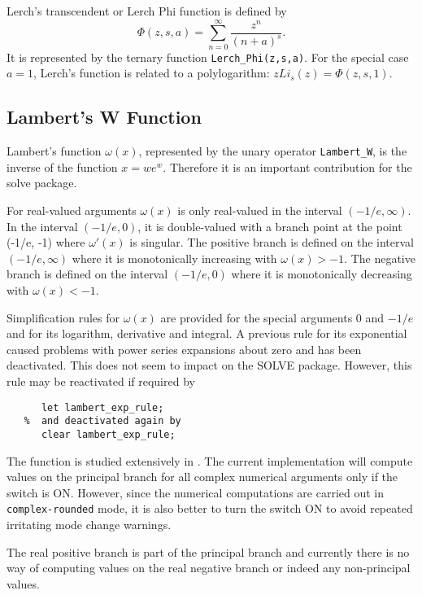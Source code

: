 Lerch's transcendent or Lerch Phi function is defined by
$$\Phi(z,s,a) = \sum_{n=0}^\infty \frac{z^n}{(n+a)^s}.$$
It is represented by the ternary function \texttt{Lerch\_Phi(z,s,a)}.
For the special case $a=1$, Lerch's function is related to a polylogarithm:
$z Li_s(z) = \Phi(z,s,1)$.

\subsection{Lambert's W Function}
\hypertarget{LAMBERTW}{}

Lambert's function $\omega(x)$, represented by the unary
operator \texttt{Lambert\_W}, is the inverse of the function
$x=we^w$. Therefore it is an important contribution for the solve
package.

For real-valued arguments $\omega(x)$ is only real-valued in the
interval $(-1/e, \infty)$.  In the interval $(-1/e, 0)$, it is double-valued
with a branch point at the point (-1/e, -1) where $\omega'(x)$ is singular.
The positive branch is defined on the interval $(-1/e, \infty)$ where it is
monotonically increasing with $\omega(x) > -1$. The negative branch is defined
on the interval $(-1/e, 0)$ where it is monotonically decreasing with
$\omega(x) < -1$.

Simplification rules for $\omega(x)$ are provided for the special arguments
$0$ and $-1/e$ and for its logarithm, derivative and integral.
A previous rule for its exponential caused problems with power series expansions
about zero and has been deactivated. This does not seem to impact on the SOLVE
package. However, this rule may be reactivated if required by
\begin{verbatim}
      let lambert_exp_rule;
   %  and deactivated again by
      clear lambert_exp_rule;
\end{verbatim}

The function is studied extensively in \cite{HareCorless:92}.  
The current implementation will compute values on the principal branch for
all complex numerical arguments  only if the switch  is ON.
However, since the numerical computations are carried out in
\texttt{complex-rounded} mode, it is also better to turn the switch
 ON to avoid repeated irritating mode change warnings.

The real positive branch is part of the principal branch and currently there
is no way of computing values on the real negative  branch or indeed any
non-principal values.

